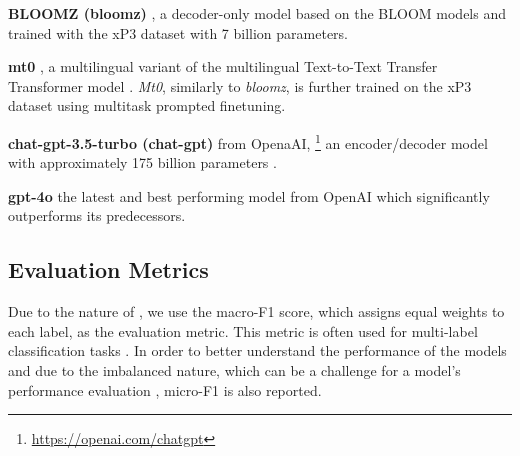\noindent \textbf{BLOOMZ (bloomz)} \cite{muennighoff2022crosslingual}, a decoder-only model based on the BLOOM models and trained with the xP3 dataset \cite{BLOOM} with 7 billion parameters.

\noindent  \textbf{mt0} \cite{muennighoff2022crosslingual}, a multilingual variant of the multilingual Text-to-Text Transfer Transformer model \cite{xue2020mt5}. %
\textit{Mt0}, similarly to \textit{bloomz}, is further trained on the xP3 dataset using multitask prompted finetuning.%

\noindent  \textbf{chat-gpt-3.5-turbo (chat-gpt)} from OpenaAI, \footnote{\url{https://openai.com/chatgpt}} an encoder/decoder model with approximately 175 billion parameters \cite{GPT3}.

\noindent  \textbf{gpt-4o } the latest and best performing model from OpenAI which significantly outperforms its predecessors. 

\subsection{Evaluation Metrics}
Due to the nature of {\XTOPIC}, we use the macro-F1 score, which assigns equal weights to each label, as the evaluation metric. This metric is often used for multi-label classification tasks \cite{tujnas.v6i6.1329, lipton-mldiscovery, mohammad2018semeval}. In order to better understand the performance of the models and due to the imbalanced nature, which can be a challenge for a model's performance evaluation \cite{tkde.2008.239}, micro-F1 is also reported.



